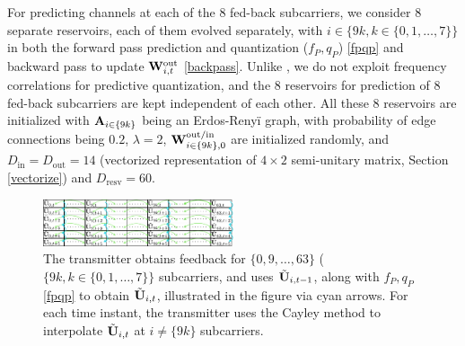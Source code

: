 \documentclass[conference]{IEEEtran}
\begin{document}
For predicting channels at each of the $8$ fed-back subcarriers, we consider $8$ separate reservoirs, each of them evolved separately, with $i\in\{9k, k \in \{0,1,\ldots,7\}\}$ in both the forward pass prediction and quantization ($f_P,q_P$) \eqref{fpqp} and backward pass to update ${\bf W}_{i,t}^{\text{out}}$ \eqref{backpass}. Unlike \cite{Gupt1905:Predictive}, we do not exploit frequency correlations for predictive quantization, and the $8$ reservoirs for prediction of $8$ fed-back subcarriers are kept independent of each other.
All these 8 reservoirs are initialized with ${\bf A}_{i\in\{9k\}}$ being an Erdos-Reny\"i graph, with probability of edge connections being $0.2$, $\lambda=2$, ${\bf W}^{\text{out/in}}_{i\in\{9k\},0}$ are initialized randomly, and $D_{\text{in}}=D_{\text{out}}=14$ (vectorized representation of $4\times2$ semi-unitary matrix, Section \ref{vectorize}) and $D_{\text{resv}}=60$.

\begin{figure}
\centering
\includegraphics[width=0.5\textwidth]{images/table.pdf}
\caption{The transmitter obtains feedback for $\{0,9,\ldots,63\}$ ($\{9k, k \in \{0,1,\ldots,7\}\}$ subcarriers, and uses $\tilde{{\bf U}}_{i,t-1}$, along with $f_P,q_P$ \eqref{fpqp} to obtain $\tilde{{\bf U}}_{i,t}$, illustrated in the figure via cyan arrows. For each time instant, the transmitter uses the Cayley method to interpolate $\tilde{{\bf U}}_{i,t}$ at $i\neq\{9k\}$ subcarriers.}
\label{table}
\vspace{-8pt}
\end{figure}
\end{document}
